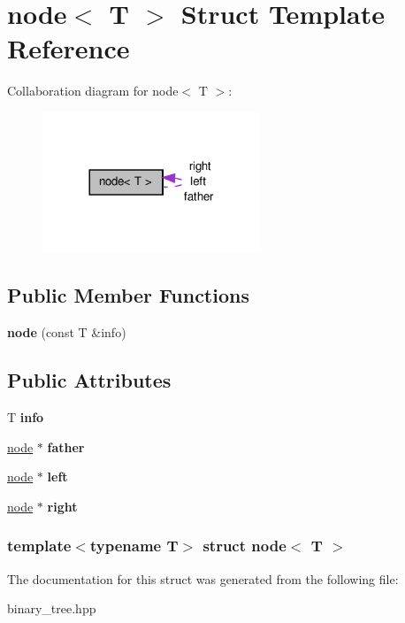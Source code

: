 \hypertarget{structnode}{\section{node$<$ \-T $>$ \-Struct \-Template \-Reference}
\label{structnode}
}


\-Collaboration diagram for node$<$ \-T $>$\-:
\nopagebreak
\begin{figure}[H]
\begin{center}
\leavevmode
\includegraphics[width=185pt]{structnode__coll__graph}
\end{center}
\end{figure}
\subsection*{\-Public \-Member \-Functions}
\begin{DoxyCompactItemize}
\item 
\hypertarget{structnode_a66ff74da7e2d8b9133a9e2343ac6c4b0}{{\bfseries node} (const \-T \&info)}\label{structnode_a66ff74da7e2d8b9133a9e2343ac6c4b0}

\end{DoxyCompactItemize}
\subsection*{\-Public \-Attributes}
\begin{DoxyCompactItemize}
\item 
\hypertarget{structnode_ae7fd8df776fdbb68ade841d55938e36a}{\-T {\bfseries info}}\label{structnode_ae7fd8df776fdbb68ade841d55938e36a}

\item 
\hypertarget{structnode_ab511d965be6d4f53b4596b1a8fbbf82e}{\hyperlink{structnode}{node} $\ast$ {\bfseries father}}\label{structnode_ab511d965be6d4f53b4596b1a8fbbf82e}

\item 
\hypertarget{structnode_ac7cfc33e386ed2a416407a3cc073d089}{\hyperlink{structnode}{node} $\ast$ {\bfseries left}}\label{structnode_ac7cfc33e386ed2a416407a3cc073d089}

\item 
\hypertarget{structnode_acb9c99bdeb8c894abbf2078717784d5c}{\hyperlink{structnode}{node} $\ast$ {\bfseries right}}\label{structnode_acb9c99bdeb8c894abbf2078717784d5c}

\end{DoxyCompactItemize}
\subsubsection*{template$<$typename \-T$>$ struct node$<$ T $>$}



\-The documentation for this struct was generated from the following file\-:\begin{DoxyCompactItemize}
\item 
binary\-\_\-tree.\-hpp\end{DoxyCompactItemize}
